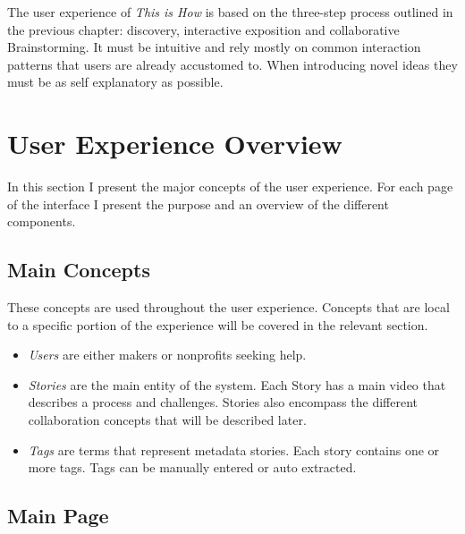 The user experience of \textit{This is How} is based on the three-step process outlined in the previous chapter: discovery, interactive exposition and collaborative Brainstorming. It must be intuitive and rely mostly on common interaction patterns that users are already accustomed to. When introducing novel ideas they must be as self explanatory as possible. 

\section{User Experience Overview}

In this section I present the major concepts of the user experience. For each page of the interface I present the purpose and an overview of the different components. 

\subsection{Main Concepts}

These concepts are used throughout the user experience. Concepts that are local to a specific portion of the experience will be covered in the relevant section.

\begin{itemize}
\item \textit{Users} are either makers or nonprofits seeking help.

\item \textit{Stories} are the main entity of the system. Each Story has a main video that describes a process and challenges. Stories also encompass the different collaboration concepts that will be described later.

\item \textit{Tags} are terms that represent metadata stories. Each story contains one or more tags. Tags can be manually entered or auto extracted. 
\end{itemize}


\subsection{Main Page}

